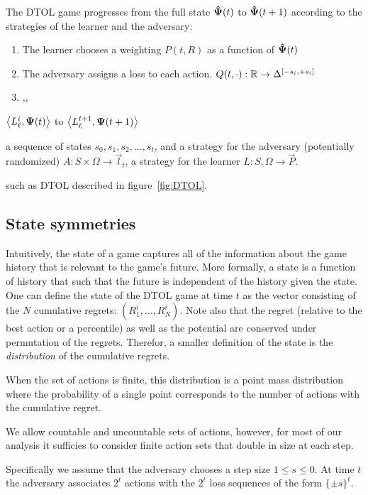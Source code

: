 \documentclass{article}[12pt]
\begin{document}
The DTOL game progresses from the full state ${\bf \hat{\Psi}}(t)$ to ${\bf \hat{\Psi}}(t+1)$ according to the strategies of the learner and the adversary:
\begin{enumerate}
\item The learner chooses a weighting $P(t,R)$ as a function of ${\bf \hat{\Psi}}(t)$
\item The adversary assigns a loss to each action. $Q(t,\cdot): \mathbb{R} \to \Delta^{[-s_i,+s_i]}$
  \item ,,
\end{enumerate}




$\left\langle L^i_\ell,{\bf \Psi}(t) \right\rangle$ to
$\left\langle L^{t+1}_\ell,{\bf \Psi}(t+1) \right\rangle$


a sequence of
states $s_0,s_1,s_2,\ldots,s_t$, and a strategy for the adversary
(potentially randomized) $A: S \times \Omega \to \vec{l}_t$, a
strategy for the learner $L:S,\Omega \to \vec{P}$.

such as DTOL described in figure~\ref{fig:DTOL}. 

\subsection{State symmetries}


Intuitively, the state of a
game captures all of the information about the game history that is
relevant to the game's future. More formally, a state is a function of
history that such that the future is independent of the history given
the state. One can define the state of the DTOL game at time $t$ as
the vector consisting of the $N$ cumulative regrets:
$(R_1^i,\ldots,R_N^i)$. Note also that the regret (relative to the
best action or a percentile) as well as the potential are conserved
under permutation of the regrets. Therefor, a smaller definition of
the state is the {\em distribution} of the cumulative regrets.

When the set of actions is finite, this distribution is a point mass
distribution where the probability of a single point corresponds to
the number of actions with the cumulative regret.

We allow countable and uncountable sets of actions, however, for most of our analysis it sufficies to consider 
finite action sets that double in size at each step.

Specifically we assume that the adversary chooses a step size $1 \leq s \leq 0$. At time $t$ the adversary
associates $2^t$ actions with the $2^t$ loss sequences of the form $\{\pm s\}^t$.
\end{document}
